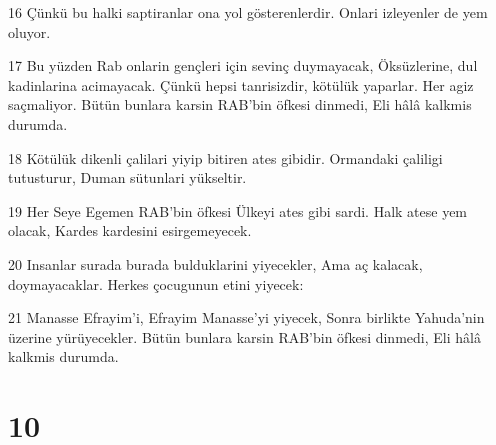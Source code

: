 \par 16 Çünkü bu halki saptiranlar ona yol gösterenlerdir. Onlari izleyenler de yem oluyor.
\par 17 Bu yüzden Rab onlarin gençleri için sevinç duymayacak, Öksüzlerine, dul kadinlarina acimayacak. Çünkü hepsi tanrisizdir, kötülük yaparlar. Her agiz saçmaliyor. Bütün bunlara karsin RAB'bin öfkesi dinmedi, Eli hâlâ kalkmis durumda.
\par 18 Kötülük dikenli çalilari yiyip bitiren ates gibidir. Ormandaki çaliligi tutusturur, Duman sütunlari yükseltir.
\par 19 Her Seye Egemen RAB'bin öfkesi Ülkeyi ates gibi sardi. Halk atese yem olacak, Kardes kardesini esirgemeyecek.
\par 20 Insanlar surada burada bulduklarini yiyecekler, Ama aç kalacak, doymayacaklar. Herkes çocugunun etini yiyecek:
\par 21 Manasse Efrayim'i, Efrayim Manasse'yi yiyecek, Sonra birlikte Yahuda'nin üzerine yürüyecekler. Bütün bunlara karsin RAB'bin öfkesi dinmedi, Eli hâlâ kalkmis durumda.

\chapter{10}

